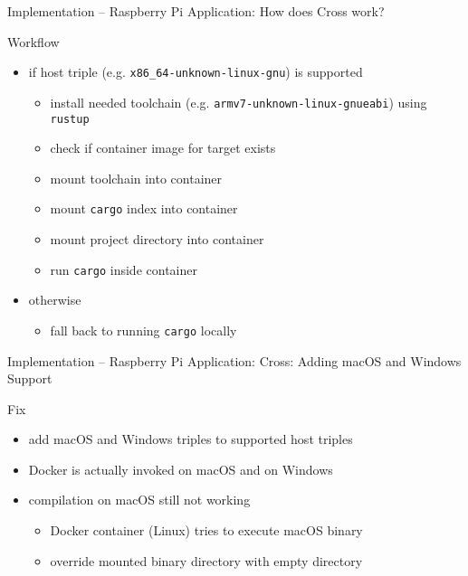 \begin{frame}{Implementation -- Raspberry Pi Application: How does Cross work?}
  \begin{block}{Workflow}
     \begin{itemize}
       \item if host triple (e.g. \texttt{x86\_64-unknown-linux-gnu}) is supported
         \begin{itemize}
          \item install needed toolchain (e.g. \texttt{armv7-unknown-linux-gnueabi}) using \texttt{rustup}
          \item check if container image for target exists
          \item mount toolchain into container
          \item mount \texttt{cargo} index into container
          \item mount project directory into container
          \item run \texttt{cargo} inside container
         \end{itemize}
       \item otherwise
         \begin{itemize}
           \item fall back to running \texttt{cargo} locally
         \end{itemize}
    \end{itemize}
  \end{block}
\end{frame}

\begin{frame}{Implementation -- Raspberry Pi Application: Cross: Adding macOS and Windows Support}
  \begin{block}{Fix}
    \begin{itemize}
      \item add macOS and Windows triples to supported host triples
    \end{itemize}
  \end{block}

  \begin{block}{}
    \begin{itemize}
      \item Docker is actually invoked on macOS and on Windows
    \end{itemize}
  \end{block}

  \begin{block}{}
    \begin{itemize}
      \item compilation on macOS still not working
        \begin{itemize}
          \item {} Docker container (Linux) tries to execute macOS binary
          \item {} override mounted binary directory with empty directory
        \end{itemize}
    \end{itemize}
  \end{block}
\end{frame}

